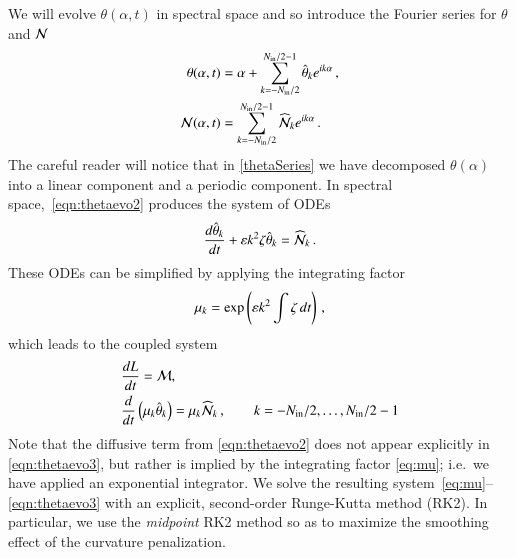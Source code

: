 \documentclass[preprint, 10pt]{elsarticle}
\begin{document}
We will evolve $\theta(\alpha,t)$ in spectral space and so introduce the Fourier series for $\theta$ and $\mathcal{N}$
\begin{align}
\label{thetaSeries}
 \theta(\alpha,t) &= \alpha + \FourierSum \thhat_k e^{ i k \alpha} \, , \\
 \NLterm(\alpha,t)  &= \FourierSum \widehat{\NLterm}_k e^{ i k \alpha} \, .
\end{align}
The careful reader will notice that in \eqref{thetaSeries} we have decomposed $\theta(\alpha)$ into a linear component and a periodic component. In spectral space,~\eqref{eqn:thetaevo2} produces the system of ODEs
\begin{align*}
\tderiv{\thhat_k}{t} +  \eps k^2  \elfun \thhat_k = \widehat{\NLterm}_k \, .
\end{align*}
These ODEs can be simplified by applying the integrating factor
\begin{align}
\label{eq:mu}
\mu_k = \exp \left( \varepsilon k^2 \int \zeta \, dt \right) \, ,
\end{align}
which leads to the coupled system
\begin{align}
\label{eqn:Levo3}
& \tderiv{L}{t} = \Mterm, \\
\label{eqn:thetaevo3}
& \tderiv{}{t}\left( \mu_k \thhat_k \right) = \mu_k \widehat{\NLterm}_k \, ,
\qquad k = -N_\iin/2, \ldots, N_\iin/2 -1
\end{align}
Note that the diffusive term from \eqref{eqn:thetaevo2} does not appear explicitly in \eqref{eqn:thetaevo3}, but rather is implied by the integrating factor \eqref{eq:mu}; i.e.~we have applied an exponential integrator. We solve the resulting system~\eqref{eq:mu}--\eqref{eqn:thetaevo3} with an
explicit, second-order Runge-Kutta method (RK2). In particular, we use the {\em midpoint} RK2 method so as to maximize the smoothing effect of the curvature penalization.
\end{document}
